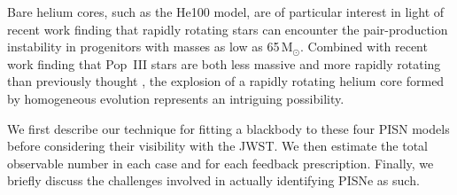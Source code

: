 \documentclass{thesis}
\newcommand{\msun}{\ensuremath{\,\mathrm{M}_{\odot}}\xspace}
\begin{document}
Bare helium cores, such as the He100 model, are of particular interest
in light of recent work finding that rapidly rotating stars can
encounter the pair-production instability in progenitors with masses
as low as 65\msun \citep{ChatzopoulosWheeler2012,
  YoonDierksLanger2012}. Combined with recent work finding that
Pop~III stars are both less massive and more rapidly rotating than
previously thought \citep{StacyGreifBromm2010, StacyBrommLoeb2011,
  StacyGreifBromm2012, Clarketal2011b, Greifetal2011, Greifetal2012},
the explosion of a rapidly rotating helium core formed by homogeneous
evolution represents an intriguing possibility.

We first describe our technique for fitting a blackbody to these four
PISN models before considering their visibility with the JWST. We then
estimate the total observable number in each case and for each
feedback prescription.  Finally, we briefly discuss the challenges
involved in actually identifying PISNe as such.
\end{document}
